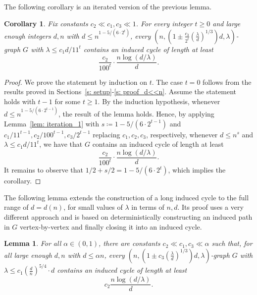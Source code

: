 \documentclass[reqno,a4paper]{amsart}
\newtheorem{lemma}[theorem]{Lemma}
\newtheorem{corollary}[theorem]{Corollary}
\theoremstyle{definition}
\begin{document}
The following corollary is an iterated version of the previous lemma.
\begin{corollary}\label{lem: concluding iterations}
Fix constants $c_2\ll c_1,c_3\ll 1$. 
For every integer $t\ge 0$ and large enough integers $d,n$ with $d\le n^{1-5/(6\cdot 2^t)}$, every $\left(n,\left(1\pm \frac{c_3}{2^t}(\frac{\lambda}{d})^{1/3}\right)d,\lambda\right)$-graph $G$ with $\lambda\le c_1 d/11^t$ contains an induced cycle of length at least
    \[
        \frac{c_2}{100^t}\cdot \frac{n\log(d/\lambda)}{d}.
    \]
%    
\end{corollary}
\begin{proof}
We prove the statement by induction on $t$. The case $t=0$ follows from the results proved in Sections~\ref{s: setup}-\ref{s: proof_d<<n}.
Assume the statement holds with $t-1$ for some $t\ge 1$. 
By the induction hypothesis, whenever $d\le n^{1-5/(6\cdot 2^{t-1})}$, the result of the lemma holds. Hence, by applying Lemma~\ref{lem: iteration_1} with 
$s \coloneq 1-5/(6\cdot 2^{t-1})$ and $c_1/11^{t-1}, c_2/100^{t-1}, c_3/2^{t-1}$ replacing $c_1,c_2,c_3$, respectively, whenever $d\le n^s$ and $\lambda\le c_1d/11^t$, we have that $G$ contains an induced cycle of length at least
    \[
        \frac{c_2}{100^t}\cdot \frac{n\log(d/\lambda)}{d}.
    \]
It remains to observe that $1/2+s/2=1-5/(6\cdot 2^t)$, which implies the corollary.
\end{proof}

The following lemma extends the construction of a long induced cycle to the full range of $d=d(n)$, for small values of $\lambda$ in terms of $n,d$. Its proof uses a very different approach and is based on deterministically constructing an induced path in $G$ vertex-by-vertex and finally closing it into an induced cycle.

\begin{lemma}\label{lem: one by one}
For all $\alpha\in (0,1)$, there are constants $c_2\ll c_1,c_3\ll \alpha$ such that, for all large enough $d,n$ with $d\le \alpha n$, every $\left(n,\left(1\pm c_3(\frac{\lambda}{d})^{1/3}\right) d,\lambda\right)$-graph $G$ with $\lambda\le c_1 \left(\frac{d}{n}\right)^{5/4}\cdot d$ contains an induced cycle of length at least
    \[
        c_2\frac{n\log(d/\lambda)}{d}.
    \]
\end{lemma}
\end{document}
